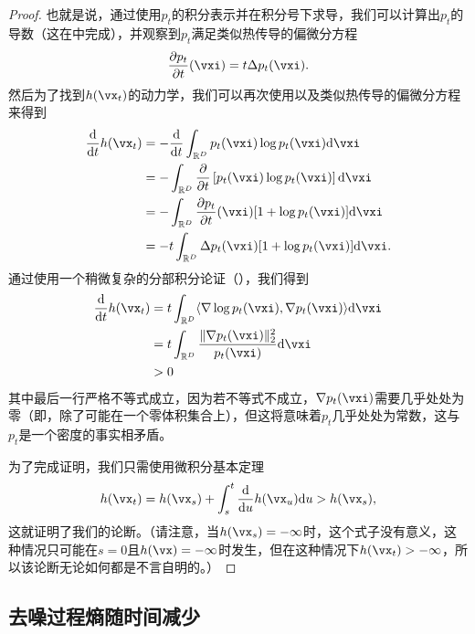 \documentclass[../../book-main_zh.tex]{subfiles}
\begin{document}
\begin{proof}
    也就是说，通过使用\(p_{t}\)的积分表示并在积分号下求导，我们可以计算出\(p_{t}\)的导数（这在中完成），并观察到\(p_{t}\)满足类似热传导的偏微分方程
    \begin{equation}
        \pdv{p_{t}}{t}(\vxi) = t\Delta p_{t}(\vxi).
    \end{equation}
    然后为了找到\(h(\vx_{t})\)的动力学，我们可以再次使用以及类似热传导的偏微分方程来得到
    \begin{align}
        \odv*{h(\vx_{t})}{t}
        &= -\odv*{\int_{\R^{D}}p_{t}(\vxi)\log p_{t}(\vxi)\odif{\vxi}}{t} \\
        &= -\int_{\R^{D}}\pdv*{\bs{p_{t}(\vxi)\log p_{t}(\vxi)}}{t}\odif{\vxi} \\
        &= -\int_{\R^{D}}\pdv{p_{t}}{t}(\vxi)[1 + \log p_{t}(\vxi)]\odif{\vxi} \\
        &= -t\int_{\R^{D}}\Delta p_{t}(\vxi)[1 + \log p_{t}(\vxi)]\odif{\vxi}.
    \end{align}
    通过使用一个稍微复杂的分部积分论证（），我们得到
    \begin{align}
        \odv*{h(\vx_{t})}{t}
        &= t\int_{\R^{D}}\ip{\nabla \log p_{t}(\vxi)}{\nabla p_{t}(\vxi)}\odif{\vxi} \\
        &= t\int_{\R^{D}}\frac{\norm{\nabla p_{t}(\vxi)}_{2}^{2}}{p_{t}(\vxi)}\odif{\vxi} \\
        &> 0
    \end{align}
    其中最后一行严格不等式成立，因为若不等式不成立，\(\nabla p_{t}(\vxi)\)需要几乎处处为零（即，除了可能在一个零体积集合上），但这将意味着\(p_{t}\)几乎处处为常数，这与\(p_{t}\)是一个密度的事实相矛盾。

    为了完成证明，我们只需使用微积分基本定理
    \begin{equation}
        h(\vx_{t}) = h(\vx_{s}) + \int_{s}^{t}\odv*{h(\vx_{u})}{u}\odif{u} > h(\vx_{s}),
    \end{equation}
    这就证明了我们的论断。（请注意，当\(h(\vx_{s}) = -\infty\)时，这个式子没有意义，这种情况只可能在\(s=0\)且\(h(\vx)=-\infty\)时发生，但在这种情况下\(h(\vx_{t}) > -\infty\)，所以该论断无论如何都是不言自明的。）
\end{proof}

\subsection{去噪过程熵随时间减少}\label{sub:denoising_entropy_decreases}
\end{document}
